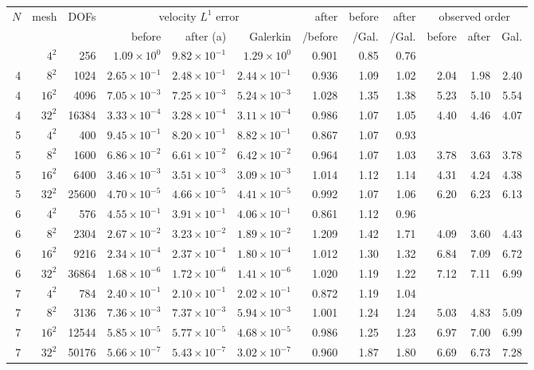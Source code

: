 \documentclass[10pt]{article}
\begin{document}
{\footnotesize\setlength{\tabcolsep}{3.2pt}
\begin{longtable}{@{}rrr*{3}{r}*{3}{r}*{3}{r}@{}}
\toprule
$N$ & mesh & DOFs & \multicolumn{3}{c}{velocity $L^1$ error} & after & before & after & \multicolumn{3}{c}{observed order}\\
\cmidrule(lr){4-6}\cmidrule(lr){10-12}
 & & & before & after (a) & Galerkin & /before & /Gal. & /Gal. & before & after & Gal.\\
\midrule\endhead
\bottomrule\endfoot
4 & $4^2$ & 256 & $1.09\times10^{0}$ & $9.82\times10^{-1}$ & $1.29\times10^{0}$ & 0.901 & 0.85 & 0.76 &  &  & \\
4 & $8^2$ & 1024 & $2.65\times10^{-1}$ & $2.48\times10^{-1}$ & $2.44\times10^{-1}$ & 0.936 & 1.09 & 1.02 & 2.04 & 1.98 & 2.40\\
4 & $16^2$ & 4096 & $7.05\times10^{-3}$ & $7.25\times10^{-3}$ & $5.24\times10^{-3}$ & 1.028 & 1.35 & 1.38 & 5.23 & 5.10 & 5.54\\
4 & $32^2$ & 16384 & $3.33\times10^{-4}$ & $3.28\times10^{-4}$ & $3.11\times10^{-4}$ & 0.986 & 1.07 & 1.05 & 4.40 & 4.46 & 4.07\\\midrule
5 & $4^2$ & 400 & $9.45\times10^{-1}$ & $8.20\times10^{-1}$ & $8.82\times10^{-1}$ & 0.867 & 1.07 & 0.93 &  &  & \\
5 & $8^2$ & 1600 & $6.86\times10^{-2}$ & $6.61\times10^{-2}$ & $6.42\times10^{-2}$ & 0.964 & 1.07 & 1.03 & 3.78 & 3.63 & 3.78\\
5 & $16^2$ & 6400 & $3.46\times10^{-3}$ & $3.51\times10^{-3}$ & $3.09\times10^{-3}$ & 1.014 & 1.12 & 1.14 & 4.31 & 4.24 & 4.38\\
5 & $32^2$ & 25600 & $4.70\times10^{-5}$ & $4.66\times10^{-5}$ & $4.41\times10^{-5}$ & 0.992 & 1.07 & 1.06 & 6.20 & 6.23 & 6.13\\\midrule
6 & $4^2$ & 576 & $4.55\times10^{-1}$ & $3.91\times10^{-1}$ & $4.06\times10^{-1}$ & 0.861 & 1.12 & 0.96 &  &  & \\
6 & $8^2$ & 2304 & $2.67\times10^{-2}$ & $3.23\times10^{-2}$ & $1.89\times10^{-2}$ & 1.209 & 1.42 & 1.71 & 4.09 & 3.60 & 4.43\\
6 & $16^2$ & 9216 & $2.34\times10^{-4}$ & $2.37\times10^{-4}$ & $1.80\times10^{-4}$ & 1.012 & 1.30 & 1.32 & 6.84 & 7.09 & 6.72\\
6 & $32^2$ & 36864 & $1.68\times10^{-6}$ & $1.72\times10^{-6}$ & $1.41\times10^{-6}$ & 1.020 & 1.19 & 1.22 & 7.12 & 7.11 & 6.99\\\midrule
7 & $4^2$ & 784 & $2.40\times10^{-1}$ & $2.10\times10^{-1}$ & $2.02\times10^{-1}$ & 0.872 & 1.19 & 1.04 &  &  & \\
7 & $8^2$ & 3136 & $7.36\times10^{-3}$ & $7.37\times10^{-3}$ & $5.94\times10^{-3}$ & 1.001 & 1.24 & 1.24 & 5.03 & 4.83 & 5.09\\
7 & $16^2$ & 12544 & $5.85\times10^{-5}$ & $5.77\times10^{-5}$ & $4.68\times10^{-5}$ & 0.986 & 1.25 & 1.23 & 6.97 & 7.00 & 6.99\\
7 & $32^2$ & 50176 & $5.66\times10^{-7}$ & $5.43\times10^{-7}$ & $3.02\times10^{-7}$ & 0.960 & 1.87 & 1.80 & 6.69 & 6.73 & 7.28\\
\end{longtable}}
\end{document}
